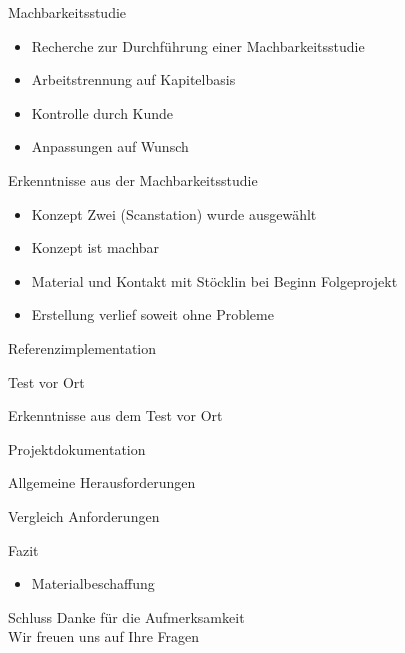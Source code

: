 \documentclass{beamer}
\begin{document}
\begin{frame}{Machbarkeitsstudie}
\begin{itemize}
    \item Recherche zur Durchführung einer Machbarkeitsstudie
    \item Arbeitstrennung auf Kapitelbasis
    \item Kontrolle durch Kunde
    \item Anpassungen auf Wunsch
\end{itemize}
\end{frame}
\begin{frame}{Erkenntnisse aus der Machbarkeitsstudie}
\begin{itemize}
    \item Konzept Zwei (Scanstation) wurde ausgewählt
    \item Konzept ist machbar
    \item Material und Kontakt mit Stöcklin bei Beginn Folgeprojekt
    \item Erstellung verlief soweit ohne Probleme
\end{itemize}
\end{frame}
\begin{frame}{Referenzimplementation}

\end{frame}
\begin{frame}{Test vor Ort}

\end{frame}
\begin{frame}{Erkenntnisse aus dem Test vor Ort}

\end{frame}
\begin{frame}{Projektdokumentation}

\end{frame}
\begin{frame}{Allgemeine Herausforderungen}

\end{frame}
\begin{frame}{Vergleich Anforderungen}

\end{frame}
\begin{frame}{Fazit}
\begin{itemize}
    \item Materialbeschaffung
\end{itemize}
\end{frame}
\begin{frame}{Schluss}
\centering
\Large{Danke für die Aufmerksamkeit}\\
\vspace{1em}
\Large{Wir freuen uns auf Ihre Fragen}
\end{frame}
\end{document}
